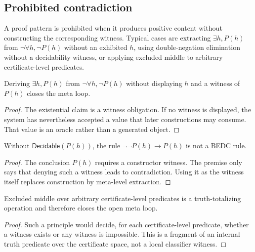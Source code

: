 \subsection{Prohibited contradiction}
\label{subsec:philosophy-prohibited-contradiction}

\begin{definition}
\label{def:philosophy-prohibited-positive-extraction}
A proof pattern is prohibited when it produces positive content without
constructing the corresponding witness. Typical cases are extracting
\(\exists h, P(h)\) from \(\neg\forall h,\neg P(h)\) without an
exhibited \(h\), using double-negation elimination without a
decidability witness, or applying excluded middle to arbitrary
certificate-level predicates.
\end{definition}

\begin{theorem}
\label{thm:philosophy-unwitnessed-existence-meta-closure}
Deriving \(\exists h, P(h)\) from \(\neg\forall h,\neg P(h)\) without
displaying \(h\) and a witness of \(P(h)\) closes the meta loop.
\end{theorem}
\begin{proof}
The existential claim is a witness obligation. If no witness is
displayed, the system has nevertheless accepted a value that later
constructions may consume. That value is an oracle rather than a
generated object.
\end{proof}

\begin{theorem}
\label{thm:philosophy-undecided-double-negation-meta-closure}
Without \(\mathsf{Decidable}(P(h))\), the rule
\(\neg\neg P(h)\to P(h)\) is not a BEDC rule.
\end{theorem}
\begin{proof}
The conclusion \(P(h)\) requires a constructor witness. The premise
only says that denying such a witness leads to contradiction. Using it
as the witness itself replaces construction by meta-level extraction.
\end{proof}

\begin{theorem}
\label{thm:philosophy-global-excluded-middle-meta-closure}
Excluded middle over arbitrary certificate-level predicates is a
truth-totalizing operation and therefore closes the open meta loop.
\end{theorem}
\begin{proof}
Such a principle would decide, for each certificate-level predicate,
whether a witness exists or any witness is impossible. This is a
fragment of an internal truth predicate over the certificate space, not
a local classifier witness.
\end{proof}

